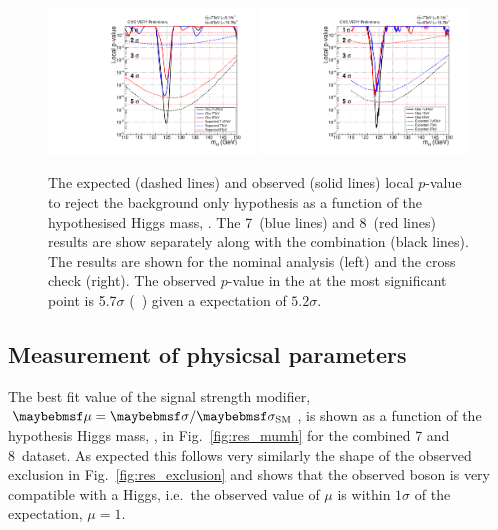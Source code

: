 \begin{figure}
  \includegraphics[width=0.49\textwidth]{ch5_anal_and_results/plots/results/obspvalue.pdf}
  \includegraphics[width=0.49\textwidth]{ch5_anal_and_results/plots/results/obspvalue_sideband.pdf}
  \caption{The expected (dashed lines) and observed (solid lines) local $p$-value to reject the background only hypothesis as a function of the hypothesised Higgs mass, \mH. The 7~\TeV (blue lines) and 8~\TeV (red lines) results are show separately along with the combination (black lines). The results are shown for the nominal \MFM analysis (left) and the cross check \SMVA (right). The observed $p$-value in the \MFM at the most significant point is 5.7$\sigma$ (~\GeV) given a \SM expectation of $5.2\sigma$. \plotupdate}
  \label{fig:res_pvalue}
\end{figure}

\subsection{Measurement of physicsal parameters}

The best fit value of the signal strength modifier, $\mu=\musm$, is shown as a function of the hypothesis Higgs mass, \mH, in Fig.~\ref{fig:res_mumh} for the combined 7 and 8~\TeV dataset. As expected this follows very similarly the shape of the observed exclusion in Fig.~\ref{fig:res_exclusion} and shows that the observed boson is very compatible with a \SM Higgs, i.e.~the observed value of $\mu$ is within $1\sigma$ of the \SM expectation, $\mu=1$. 

